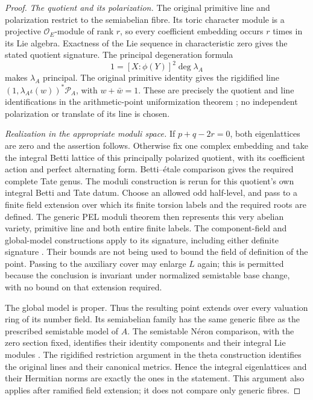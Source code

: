 \begin{proof}
\emph{The quotient and its polarization.}
The original primitive line and polarization restrict to the
semiabelian fibre. Its toric character module is a projective
$\mathcal O_E$-module of rank $r$, so every coefficient embedding
occurs $r$ times in its Lie algebra. Exactness of the Lie sequence
in characteristic zero gives the stated quotient signature. The
principal degeneration formula
\[
                 1=[X:\phi(Y)]^2\deg\lambda_A
\]
makes $\lambda_A$ principal. The original primitive identity gives
the rigidified line
$(1,\lambda_A\iota(w))^*\mathcal P_A$, with
$w+\bar w=1$. These are precisely the quotient and line
identifications in the arithmetic-point uniformization theorem
\cite{current-construction-record}; no independent polarization or
translate of its line is chosen.

\emph{Realization in the appropriate moduli space.}
If $p+q-2r=0$, both eigenlattices are zero and the assertion follows.
Otherwise fix one complex embedding and take the integral Betti
lattice of this principally polarized quotient, with its coefficient
action and perfect alternating form. Betti--\'etale comparison gives
the required complete Tate genus. The moduli construction is rerun
for this quotient's own integral Betti and Tate datum. Choose an
allowed odd half-level,
and pass to a finite field extension over which its finite torsion
labels and the required roots are defined. The generic PEL moduli
theorem then represents this very abelian variety, primitive line and
both entire finite labels. The component-field and global-model
constructions apply to its signature, including either definite
signature \cite{current-construction-record}. Their bounds are not
being used to bound the field of definition of the point. Passing
to the auxiliary cover may enlarge $L$ again; this is permitted
because the conclusion is invariant under normalized semistable
base change, with no bound on that extension required.

The global model is proper. Thus the resulting point extends over
every valuation ring of its number field. Its semiabelian family
has the same generic fibre as the prescribed semistable model of
$A$. The semistable N\'eron comparison, with the zero section fixed,
identifies their identity components and their integral Lie modules
\cite[Theorem 4.4 and Corollary 4.5]{conrad-semistable}.
The rigidified restriction argument in the theta construction
identifies the original lines and their canonical metrics. Hence
the integral eigenlattices and their Hermitian norms are exactly
the ones in the statement. This argument also applies after
ramified field extension; it does not compare only generic fibres.


\end{proof}

